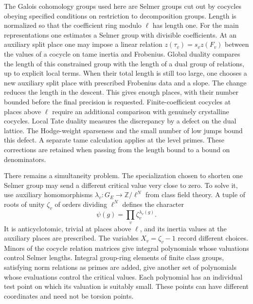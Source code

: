 The Galois cohomology groups used here are Selmer groups cut out by cocycles obeying specified conditions on restriction to decomposition groups. Length is normalized so that the coefficient ring modulo $\ell$ has length one. For the main representations one estimates a Selmer group with divisible coefficients. At an auxiliary split place one may impose a linear relation $z(\tau_v)=s_v z(F_v)$ between the values of a cocycle on tame inertia and Frobenius. Global duality compares the length of this constrained group with the length of a dual group of relations, up to explicit local terms. When their total length is still too large, one chooses a new auxiliary split place with prescribed Frobenius data and a slope. The change reduces the length in the descent. This gives enough places, with their number bounded before the final precision is requested. Finite-coefficient cocycles at places above $\ell$ require an additional comparison with genuinely crystalline cocycles. Local Tate duality measures the discrepancy by a defect on the dual lattice. The Hodge-weight sparseness and the small number of low jumps bound this defect. A separate tame calculation applies at the level primes. These corrections are retained when passing from the length bound to a bound on denominators.

There remains a simultaneity problem. The specialization chosen to shorten one Selmer group may send a different critical value very close to zero. To solve it, use auxiliary homomorphisms $\lambda_v:G_E\to\mathbb Z/\ell^N$ from class field theory. A tuple of roots of unity $\zeta_v$ of orders dividing $\ell^N$ defines the character
\[
              \psi(g)=\prod_v\zeta_v^{\lambda_v(g)}.
\]
It is anticyclotomic, trivial at places above $\ell$, and its inertia values at the auxiliary places are prescribed. The variables $X_v=\zeta_v-1$ record different choices. Minors of the cocycle relation matrices give integral polynomials whose valuations control Selmer lengths. Integral group-ring elements of finite class groups, satisfying norm relations as primes are added, give another set of polynomials whose evaluations control the critical values. Each polynomial has an individual test point on which its valuation is suitably small. These points can have different coordinates and need not be torsion points.

